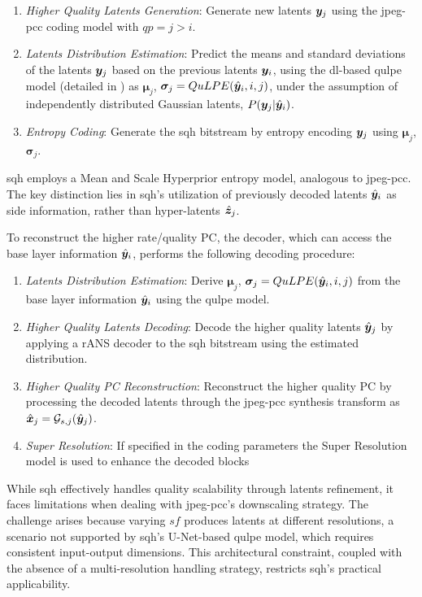 \begin{enumerate}[label=E\arabic*.]
    \item \textit{Higher Quality Latents Generation}: Generate new latents $\y_{j}$ using the \gls{jpeg-pcc} coding model with $qp = j > i$.
    \item \textit{Latents Distribution Estimation}: Predict the means and standard deviations of the
latents $\y_{j}$ based on the previous latents $\y_{i}$, using the \gls{dl}-based \gls{qulpe} model
(detailed in \cite{mari2024point}) as $\boldsymbol{\mu}_j$, $\boldsymbol{\sigma}_j = QuLPE(\hat{\y}_i, i, j)$, under the assumption of independently distributed Gaussian latents, $P(\y_j|\hat{\y}_i)$.
    \item \textit{Entropy Coding}: Generate the \gls{sqh} bitstream by entropy encoding $\y_j$ using $\boldsymbol{\mu}_j$, $\boldsymbol{\sigma}_j$.
\end{enumerate}

\gls{sqh} employs a Mean and Scale Hyperprior entropy model, analogous to \gls{jpeg-pcc}. The key distinction lies in \gls{sqh}'s utilization of previously decoded latents $\hat{\y}_i$ as side information, rather than hyper-latents $\hat{\z}_j$.


To reconstruct the higher rate/quality PC, the decoder, which can access the base layer information $\hat{\y}_i$, performs the following decoding procedure:
\begin{enumerate}[label=D\arabic*.]
    \item \textit{Latents Distribution Estimation}: Derive $\boldsymbol{\mu}_{j}$, $\boldsymbol{\sigma}_{j} = QuLPE(\hat{\y}_i, i, j)$ from the base layer information $\hat{\y}_i$ using the \gls{qulpe} model.
    \item \textit{Higher Quality Latents Decoding}: Decode the higher quality latents $\hat{\y}_{j}$ by applying a rANS decoder to the \gls{sqh} bitstream using the estimated distribution.
    \item \textit{Higher Quality PC Reconstruction}: Reconstruct the higher quality PC by processing the decoded latents through the \gls{jpeg-pcc} synthesis transform as $\hat{\x}_{j} = \mathcal{G}_{s, j}(\hat{\y}_{j})$.
    \item \textit{Super Resolution}: If specified in the coding parameters the Super Resolution model is used to enhance the decoded blocks
\end{enumerate}

While \gls{sqh} effectively handles quality scalability through latents refinement, it faces limitations when dealing with \gls{jpeg-pcc}'s downscaling strategy. The challenge arises because varying $sf$ produces latents at different resolutions, a scenario not supported by \gls{sqh}'s U-Net-based \gls{qulpe} model, which requires consistent input-output dimensions. This architectural constraint, coupled with the absence of a multi-resolution handling strategy, restricts \gls{sqh}'s practical applicability. 

